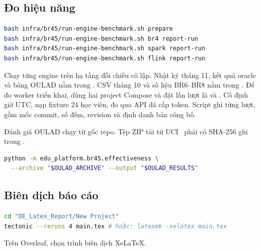 \subsection{Đo hiệu năng}

\begin{lstlisting}[language=bash]
bash infra/br45/run-engine-benchmark.sh prepare
bash infra/br45/run-engine-benchmark.sh br4 report-run
bash infra/br45/run-engine-benchmark.sh spark report-run
bash infra/br45/run-engine-benchmark.sh flink report-run
\end{lstlisting}

Chạy từng engine trên hạ tầng đối chiếu cô lập. Nhật ký tháng 11, kết quả oracle và bảng OULAD nằm trong . CSV tháng 10 và số liệu BR6--BR8 nằm trong . Để đo worker triển khai, dùng hai project Compose và đặt  lần lượt là  và . Cố định giờ UTC, nạp fixture 24 học viên, đo qua API đã cấp token. Script  ghi từng lượt, gồm mốc commit, số đếm, revision và định danh bản công bố.

Đánh giá OULAD chạy từ gốc repo. Tệp ZIP tải từ UCI~\cite{ucioulad} phải có SHA-256 ghi trong .

\begin{lstlisting}[language=bash]
python -m edu_platform.br45.effectiveness \
  --archive "$OULAD_ARCHIVE" --output "$OULAD_RESULTS"
\end{lstlisting}

\subsection{Biên dịch báo cáo}

\begin{lstlisting}[language=bash]
cd "DE_Latex_Report/New Project"
tectonic --reruns 4 main.tex # hoặc: latexmk -xelatex main.tex
\end{lstlisting}
Trên Overleaf, chọn trình biên dịch XeLaTeX.
